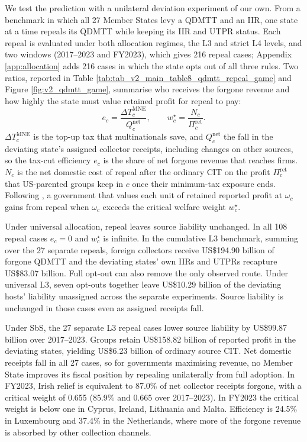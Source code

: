 \documentclass[11pt,a4paper]{article}
\newcommand{\usd}{US\$}
\begin{document}
We test the prediction with a unilateral deviation experiment of our own. From a benchmark in which all 27 Member States levy a QDMTT and an IIR, one state at a time repeals its QDMTT while keeping its IIR and UTPR status. Each repeal is evaluated under both allocation regimes, the L3 and strict L4 levels, and two windows (2017–2023 and FY2023), which gives 216 repeal cases; Appendix \ref{app:allocation} adds 216 cases in which the state opts out of all three rules. Two ratios, reported in Table \ref{tab:tab_v2_main_table8_qdmtt_repeal_game} and Figure \ref{fig:v2_qdmtt_game}, summarise who receives the forgone revenue and how highly the state must value retained profit for repeal to pay:
\begin{equation}\label{eq:repeal}
e_c=\frac{\Delta T^{\mathrm{MNE}}_c}{Q^{\mathrm{net}}_c},\qquad w^{\star}_c=\frac{N_c}{\Pi^{\mathrm{ret}}_c}.
\end{equation}
$\Delta T^{\mathrm{MNE}}_c$ is the top-up tax that multinationals save, and $Q^{\mathrm{net}}_c$ the fall in the deviating state’s assigned collector receipts, including changes on other sources, so the tax-cut efficiency $e_c$ is the share of net forgone revenue that reaches firms. $N_c$ is the net domestic cost of repeal after the ordinary CIT on the profit $\Pi^{\mathrm{ret}}_c$ that US-parented groups keep in $c$ once their minimum-tax exposure ends. Following \citet{johannesen2022}, a government that values each unit of retained reported profit at $\omega_c$ gains from repeal when $\omega_c$ exceeds the critical welfare weight $w^{\star}_c$.



Under universal allocation, repeal leaves source liability unchanged. In all 108 repeal cases $e_c=0$ and $w^{\star}_c$ is infinite. In the cumulative L3 benchmark, summing over the 27 separate repeals, foreign collectors receive \usd194.90 billion of forgone QDMTT and the deviating states' own IIRs and UTPRs recapture \usd83.07 billion. Full opt-out can also remove the only observed route. Under universal L3, seven opt-outs together leave \usd10.29 billion of the deviating hosts' liability unassigned across the separate experiments. Source liability is unchanged in those cases even as assigned receipts fall.

Under SbS, the 27 separate L3 repeal cases lower source liability by \usd99.87 billion over 2017–2023. Groups retain \usd158.82 billion of reported profit in the deviating states, yielding \usd6.23 billion of ordinary source CIT. Net domestic receipts fall in all 27 cases, so for governments maximising revenue, no Member State improves its fiscal position by repealing unilaterally from full adoption. In FY2023, Irish relief is equivalent to 87.0\% of net collector receipts forgone, with a critical weight of 0.655 (85.9\% and 0.665 over 2017–2023). In FY2023 the critical weight is below one in Cyprus, Ireland, Lithuania and Malta. Efficiency is 24.5\% in Luxembourg and 37.4\% in the Netherlands, where more of the forgone revenue is absorbed by other collection channels.
\end{document}
